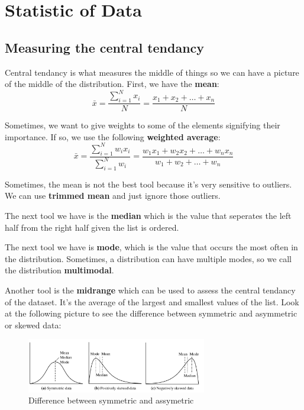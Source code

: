 \documentclass[12pt,a4paper]{article}
\begin{document}
\section{Statistic of Data}

\subsection{Measuring the central tendancy}

Central tendancy is what measures the middle of things so we can have a picture of the middle of the distribution. First, we have the \textbf{mean}: $$\bar{x}=\frac{\sum_{i=1}^{N} x_i}{N} = \frac{x_1 + x_2 + \dots + x_n}{N}$$

Sometimes, we want to give weights to some of the elements signifying their importance. If so, we use the following \textbf{weighted average}: $$\bar{x}=\frac{\sum_{i=1}^{N} w_ix_i}{\sum_{i=1}^{N} w_i} = \frac{w_1x_1 + w_2x_2 + \dots + w_nx_n}{w_1 + w_2 + \dots + w_n}$$

Sometimes, the mean is not the best tool because it's very sensitive to outliers. We can use \textbf{trimmed mean} and just ignore those outliers.

The next tool we have is the \textbf{median} which is the value that seperates the left half from the right half given the list is ordered.

The next tool we have is \textbf{mode}, which is the value that occurs the most often in the distribution. Sometimes, a distribution can have multiple modes, so we call the distribution \textbf{multimodal}.

Another tool is the \textbf{midrange} which can be used to assess the central tendancy of the dataset. It's the average of the largest and smallest values of the list. Look at the following picture to see the difference between symmetric and asymmetric or skewed data:

\begin{figure}[h]
    \centering
    \includegraphics[width=0.7\textwidth]{images/image.png}
    \caption{Difference between symmetric and assymetric}
    \label{fig:example}
\end{figure}
\end{document}
